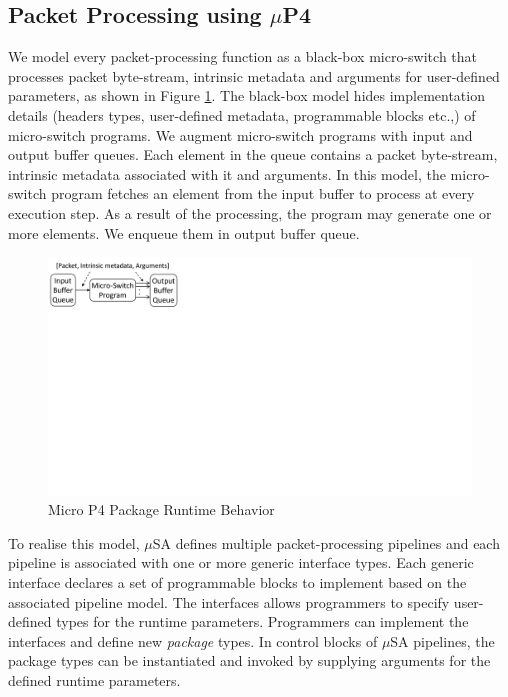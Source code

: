 \documentclass{hotnets19}
\begin{document}
\subsection{Packet Processing using $\mu$P4}
\label{subsection:packet-processing-using-mp4}
We model every packet-processing function as a black-box micro-switch that processes packet byte-stream, intrinsic metadata and arguments for user-defined parameters, as shown in Figure \ref{fig:package-runtime-behavior}.
The black-box model hides implementation details (headers types, user-defined metadata, programmable blocks etc.,) of micro-switch programs.
We augment micro-switch programs with input and output buffer queues.
Each element in the queue contains a packet byte-stream, intrinsic metadata associated with it and arguments.
In this model, the micro-switch program fetches an element from the input buffer to process at every execution step.
As a result of the processing, the program may generate one or more elements.
We enqueue them in output buffer queue.
\begin{figure}[h]
    \centering
    \includegraphics[trim=0 420 667 0, clip, scale=0.5]{microp4-program-model}
    \caption{Micro P4 Package Runtime Behavior}
    \label{fig:package-runtime-behavior}
\end{figure}

To realise this model, $\mu$SA defines multiple packet-pro\-cessing pipelines and each pipeline is associated with one or more generic interface types.
Each generic interface declares a set of programmable blocks to implement based on the associated pipeline model.
The interfaces allows programmers to specify user-defined types for the runtime parameters.
Programmers can implement the interfaces and define new \emph{package} types.
In control blocks of $\mu$SA pipelines, the package types can be instantiated and invoked by supplying arguments for the defined runtime parameters. 
\end{document}
